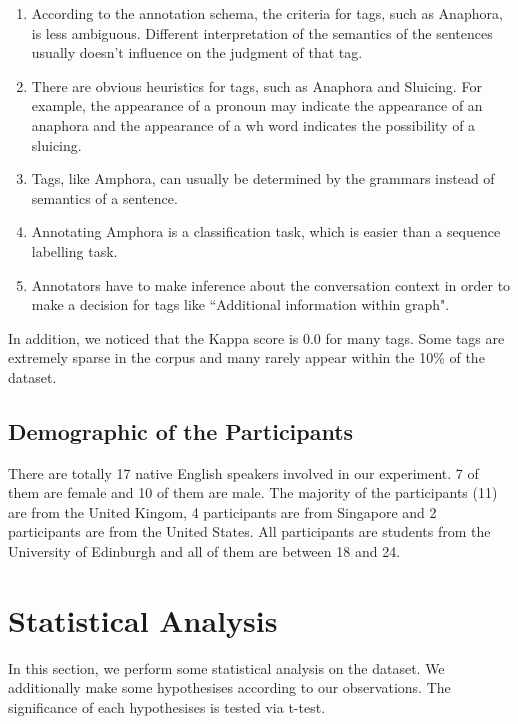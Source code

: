 \documentclass[bsc,frontabs,twoside,singlespacing,parskip,deptreport]{infthesis}     %
\begin{document}
\begin{enumerate}

    \item According to the annotation schema, the criteria for tags, such as Anaphora, is less ambiguous. Different interpretation of the semantics of the sentences usually doesn't influence on the judgment of that tag.
    
   \item There are obvious heuristics for tags, such as Anaphora and Sluicing. For example, the appearance of a pronoun may indicate the appearance of an anaphora and the appearance of a wh word indicates the possibility of a sluicing. 

   \item Tags, like Amphora, can usually be determined by the grammars instead of semantics of a sentence. 
 
   \item Annotating Amphora is a classification task, which is easier than a sequence labelling task.
   
   \item Annotators have to make inference about the conversation context in order to make a decision for tags like ``Additional information within graph".
   
\end{enumerate}

In addition, we noticed that the Kappa score is 0.0 for many tags. Some tags are extremely sparse in the corpus and many rarely appear within the 10\% of the dataset.

\subsection*{Demographic of the Participants}

There are totally 17 native English speakers involved in our experiment. 7 of them are female and 10 of them are male. The majority of the participants (11) are from the United Kingom, 4 participants are from Singapore and 2 participants are from the United States. All participants are students from the University of Edinburgh and all of them are between 18 and 24.

\section{Statistical Analysis}

In this section, we perform some statistical analysis on the dataset. We additionally make some hypothesises according to our observations. The significance of each hypothesises is tested via t-test.
\end{document}
